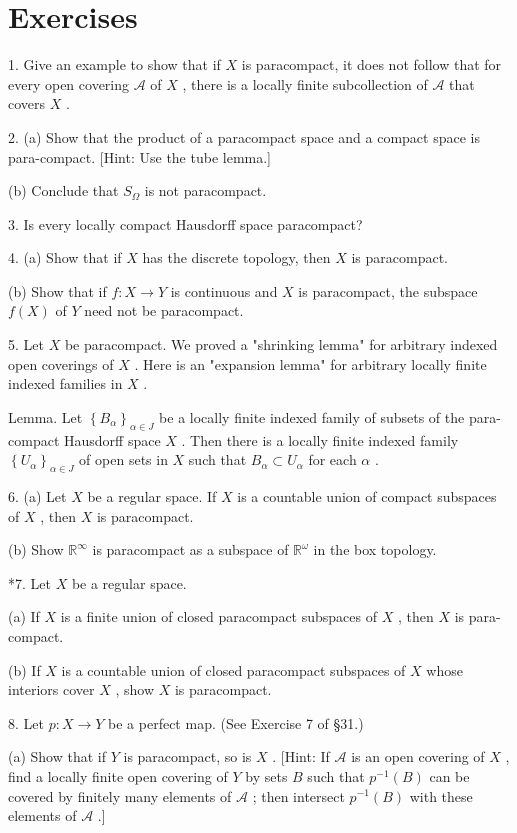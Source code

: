 \documentclass[10pt]{article}
\begin{document}
\section*{Exercises}

1. Give an example to show that if \(X\) is paracompact, it does not follow that for every open covering \(\mathcal{A}\) of \(X\) , there is a locally finite subcollection of \(\mathcal{A}\) that covers \(X\) .

2. (a) Show that the product of a paracompact space and a compact space is para-compact. [Hint: Use the tube lemma.]

(b) Conclude that \({S}_{\Omega }\) is not paracompact.

3. Is every locally compact Hausdorff space paracompact?

4. (a) Show that if \(X\) has the discrete topology, then \(X\) is paracompact.

(b) Show that if \(f : X \rightarrow  Y\) is continuous and \(X\) is paracompact, the subspace \(f\left( X\right)\) of \(Y\) need not be paracompact.

5. Let \(X\) be paracompact. We proved a "shrinking lemma" for arbitrary indexed open coverings of \(X\) . Here is an "expansion lemma" for arbitrary locally finite indexed families in \(X\) .

Lemma. Let \({\left\{  {B}_{\alpha }\right\}  }_{\alpha  \in  J}\) be a locally finite indexed family of subsets of the para-compact Hausdorff space \(X\) . Then there is a locally finite indexed family \({\left\{  {U}_{\alpha }\right\}  }_{\alpha  \in  J}\) of open sets in \(X\) such that \({B}_{\alpha } \subset  {U}_{\alpha }\) for each \(\alpha\) .

6. (a) Let \(X\) be a regular space. If \(X\) is a countable union of compact subspaces of \(X\) , then \(X\) is paracompact.

(b) Show \({\mathbb{R}}^{\infty }\) is paracompact as a subspace of \({\mathbb{R}}^{\omega }\) in the box topology.

*7. Let \(X\) be a regular space.

(a) If \(X\) is a finite union of closed paracompact subspaces of \(X\) , then \(X\) is para-compact.

(b) If \(X\) is a countable union of closed paracompact subspaces of \(X\) whose interiors cover \(X\) , show \(X\) is paracompact.

8. Let \(p : X \rightarrow  Y\) be a perfect map. (See Exercise 7 of §31.)

(a) Show that if \(Y\) is paracompact, so is \(X\) . [Hint: If \(\mathcal{A}\) is an open covering of \(X\) , find a locally finite open covering of \(Y\) by sets \(B\) such that \({p}^{-1}\left( B\right)\) can be covered by finitely many elements of \(\mathcal{A}\) ; then intersect \({p}^{-1}\left( B\right)\) with these elements of \(\mathcal{A}\) .]
\end{document}
